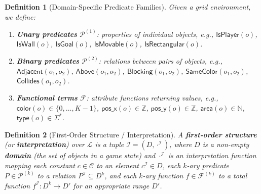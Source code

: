 \documentclass{article}
\newtheorem{definition}{Definition}
\newcommand{\calC}{\mathcal{C}}
\newcommand{\calF}{\mathcal{F}}
\newcommand{\calH}{\mathcal{H}}
\newcommand{\calI}{\mathcal{I}}
\newcommand{\calL}{\mathcal{L}}
\newcommand{\calP}{\mathcal{P}}
\newcommand{\bbN}{\mathbb{N}}
\newcommand{\bbZ}{\mathbb{Z}}
\begin{document}
\begin{definition}[Domain-Specific Predicate Families]
\label{def:pred_families}
Given a grid environment, we define:
\begin{enumerate}[nosep]
    \item \textbf{Unary predicates} $\calP^{(1)}$: properties of individual objects, e.g., $\mathsf{IsPlayer}(o)$, $\mathsf{IsWall}(o)$, $\mathsf{IsGoal}(o)$, $\mathsf{IsMovable}(o)$, $\mathsf{IsRectangular}(o)$.
    \item \textbf{Binary predicates} $\calP^{(2)}$: relations between pairs of objects, e.g., $\mathsf{Adjacent}(o_1, o_2)$, $\mathsf{Above}(o_1, o_2)$, $\mathsf{Blocking}(o_1, o_2)$, $\mathsf{SameColor}(o_1, o_2)$, $\mathsf{Collides}(o_1, o_2)$.
    \item \textbf{Functional terms} $\calF$: attribute functions returning values, e.g., $\mathsf{color}(o) \in \{0, \ldots, K-1\}$, $\mathsf{pos\_x}(o) \in \bbZ$, $\mathsf{pos\_y}(o) \in \bbZ$, $\mathsf{area}(o) \in \bbN$, $\mathsf{type}(o) \in \Sigma^*$.
\end{enumerate}
\end{definition}

\begin{definition}[First-Order Structure / Interpretation]
\label{def:fo_structure}
A \textbf{first-order structure} (or \textbf{interpretation}) over $\calL$ is a tuple $\calI = (D, \cdot^{\calI})$, where $D$ is a non-empty \textbf{domain} (the set of objects in a game state) and $\cdot^{\calI}$ is an interpretation function mapping each constant $c \in \calC$ to an element $c^{\calI} \in D$, each $k$-ary predicate $P \in \calP^{(k)}$ to a relation $P^{\calI} \subseteq D^k$, and each $k$-ary function $f \in \calF^{(k)}$ to a total function $f^{\calI} : D^k \to D'$ for an appropriate range $D'$.
\end{definition}

\end{document}
